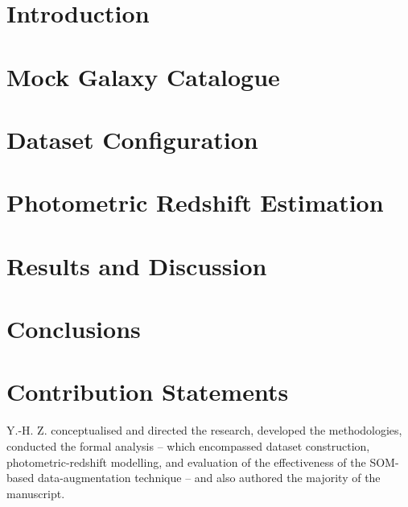 \documentclass[fleqn, usenatbib]{mnras}
\begin{document}


\section{Introduction} \label{sec:1}


\section{Mock Galaxy Catalogue} \label{sec:2}


\section{Dataset Configuration} \label{sec:3}


\section{Photometric Redshift Estimation} \label{sec:4}


\section{Results and Discussion} \label{sec:5}


\section{Conclusions} \label{sec:6}




\section*{Contribution Statements}

Y.-H. Z. conceptualised and directed the research, developed the methodologies, conducted the formal analysis -- which encompassed dataset construction, photometric-redshift modelling, and evaluation of the effectiveness of the SOM-based data-augmentation technique -- and also authored the majority of the manuscript.
\end{document}

